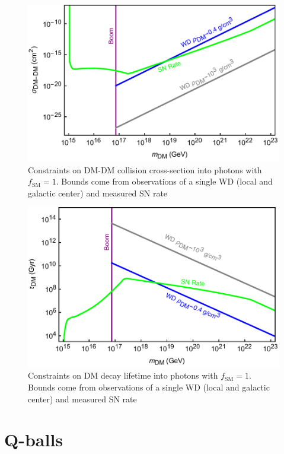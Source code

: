 \documentclass[preprintnumbers,amsmath,amssymb,prd, superscriptaddress,twocolumn]{revtex4}
\begin{document}
\begin{figure}
\includegraphics[scale=.45]{collisionobservation.pdf}
\caption{Constraints on DM-DM collision cross-section into photons with $f_\text{SM} =1$. Bounds come from observations of a single WD (local and galactic center) and measured SN rate}
\label{fig:collisionclasses}
\end{figure}

\begin{figure}
\includegraphics[scale=.45]{decayobservation.pdf}
\caption{Constraints on DM decay lifetime into photons with $f_\text{SM} =1$. Bounds come from observations of a single WD (local and galactic center) and measured SN rate}
\label{fig:decayclasses}
\end{figure}

\section{Q-balls}
\label{sec:QBalls}
\end{document}
